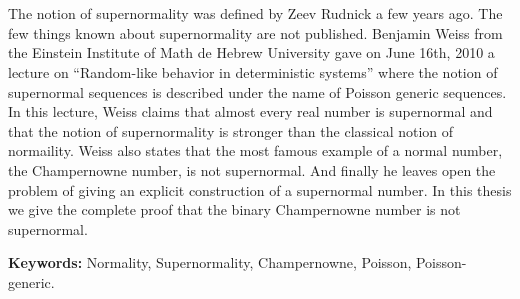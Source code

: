 \chapter*{\runtitle}

\noindent 
\noindent 

The notion of supernormality was defined by Zeev Rudnick a few years ago.
The few things known about supernormality are not published. Benjamin Weiss from the Einstein Institute of Math de Hebrew University gave on June 16th, 2010 a lecture on “Random-like behavior
in deterministic systems” where the notion of supernormal sequences is described under the name of Poisson generic sequences.
In this lecture, Weiss claims that almost every real number is supernormal and that the notion of supernormality is stronger than the classical notion of normaility.
Weiss also states that the most famous example of a normal number, the Champernowne number, is not supernormal. And finally he leaves open the problem of giving an explicit construction of a supernormal number.
In this thesis we give the complete proof that the binary Champernowne number is not supernormal.
\bigskip

\noindent\textbf{Keywords:} Normality, Supernormality, Champernowne, Poisson, Poisson-generic.